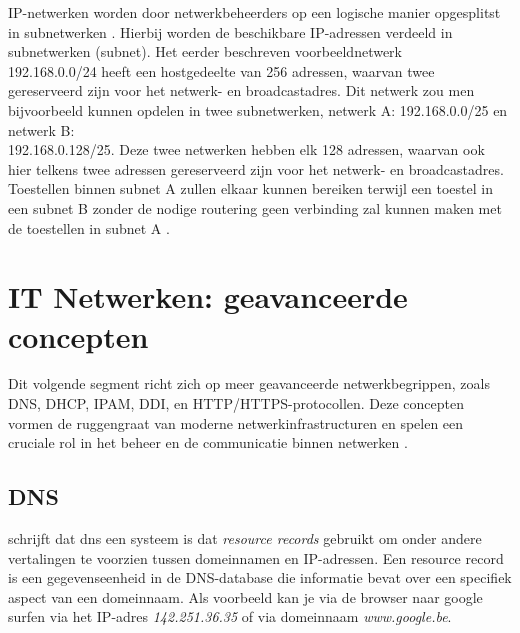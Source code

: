 IP-netwerken worden door netwerkbeheerders op een logische manier opgesplitst in subnetwerken \autocite{Thomas2000}. Hierbij worden de beschikbare IP-adressen verdeeld in subnetwerken (subnet). Het eerder beschreven voorbeeldnetwerk \\192.168.0.0/24 heeft een hostgedeelte van 256 adressen, waarvan twee gereserveerd zijn voor het netwerk- en broadcastadres. Dit netwerk zou men bijvoorbeeld kunnen opdelen in twee subnetwerken, netwerk A: 192.168.0.0/25 en netwerk B: \\192.168.0.128/25. Deze twee netwerken hebben elk 128 adressen, waarvan ook hier telkens twee adressen gereserveerd zijn voor het netwerk- en broadcastadres.
Toestellen binnen subnet A zullen elkaar kunnen bereiken terwijl een toestel in een subnet B zonder de nodige routering geen verbinding zal kunnen maken met de toestellen in subnet A \autocite{Thomas2000}.

\section{IT Netwerken: geavanceerde concepten}
Dit volgende segment richt zich op meer geavanceerde netwerkbegrippen, zoals DNS, DHCP, IPAM, DDI, en HTTP/HTTPS-protocollen. Deze concepten vormen de ruggengraat van moderne netwerkinfrastructuren en spelen een cruciale rol in het beheer en de communicatie binnen netwerken \autocite{Rooney2020}.

\subsection{DNS}
\textcite{Mockapetris1987} schrijft dat \acrshort{dns} een systeem is dat \textit{resource records} gebruikt om onder andere vertalingen te voorzien tussen domeinnamen en IP-adressen. Een resource record is een gegevenseenheid in de DNS-database die informatie bevat over een specifiek aspect van een domeinnaam. Als voorbeeld kan je via de browser naar google surfen via het IP-adres \textit{142.251.36.35} of via domeinnaam \textit{www.google.be}. 

